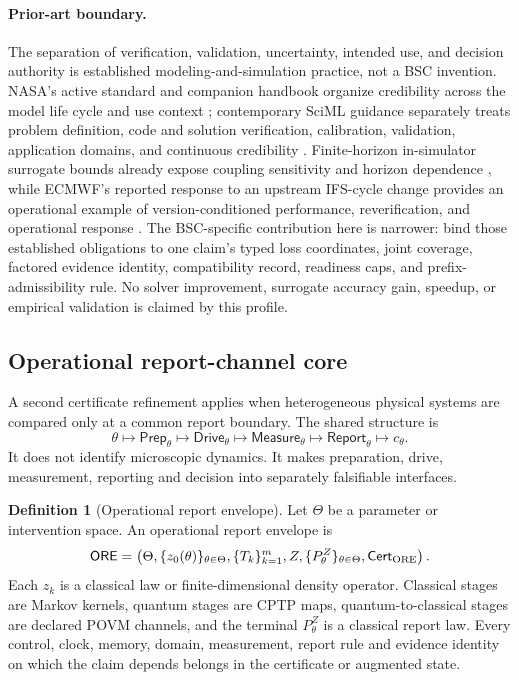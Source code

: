 \documentclass[11pt,a4paper]{article}
\theoremstyle{definition}
\newtheorem{definition}{Definition}[section]
\theoremstyle{plain}
\theoremstyle{remark}
\newcommand{\Cert}{\mathsf{Cert}}
\begin{document}
\paragraph{Prior-art boundary.}
The separation of verification, validation, uncertainty, intended use, and
decision authority is established modeling-and-simulation practice, not a
BSC invention.  NASA's active standard and companion handbook organize
credibility across the model life cycle and use context
\citep{nasa7009b}; contemporary SciML guidance separately treats problem
definition, code and solution verification, calibration, validation,
application domains, and continuous credibility \citep{jakeman2025}.
Finite-horizon in-simulator surrogate bounds already expose coupling
sensitivity and horizon dependence \citep{ellinas2026}, while ECMWF's
reported response to an upstream IFS-cycle change provides an operational
example of version-conditioned performance, reverification, and operational
response
\citep{ecmwf2026external}.  The BSC-specific contribution here is narrower:
bind those established obligations to one claim's typed loss coordinates,
joint coverage, factored evidence identity, compatibility record, readiness
caps, and prefix-admissibility rule.  No solver improvement, surrogate
accuracy gain, speedup, or empirical validation is claimed by this profile.

\subsection{Operational report-channel core}
\label{sec:operational-channel}

A second certificate refinement applies when heterogeneous physical systems
are compared only at a common report boundary.  The shared structure is
\[
\theta\longmapsto\mathsf{Prep}_\theta
\longmapsto\mathsf{Drive}_\theta
\longmapsto\mathsf{Measure}_\theta
\longmapsto\mathsf{Report}_\theta
\longmapsto c_\theta .
\]
It does not identify microscopic dynamics.  It makes preparation, drive,
measurement, reporting and decision into separately falsifiable interfaces.

\begin{definition}[Operational report envelope]\label{def:ore}
Let \(\Theta\) be a parameter or intervention space.  An operational report
envelope is
\[
\mathsf{ORE}
=
\left(
\Theta,\{z_0(\theta)\}_{\theta\in\Theta},
\{T_k\}_{k=1}^{m},Z,\{P_\theta^Z\}_{\theta\in\Theta},
\Cert_{\rm ORE}
\right).
\]
Each \(z_k\) is a classical law or finite-dimensional density operator.
Classical stages are Markov kernels, quantum stages are CPTP maps,
quantum-to-classical stages are declared POVM channels, and the terminal
\(P_\theta^Z\) is a classical report law.  Every control, clock, memory,
domain, measurement, report rule and evidence identity on which the claim
depends belongs in the certificate or augmented state.
\end{definition}
\end{document}

